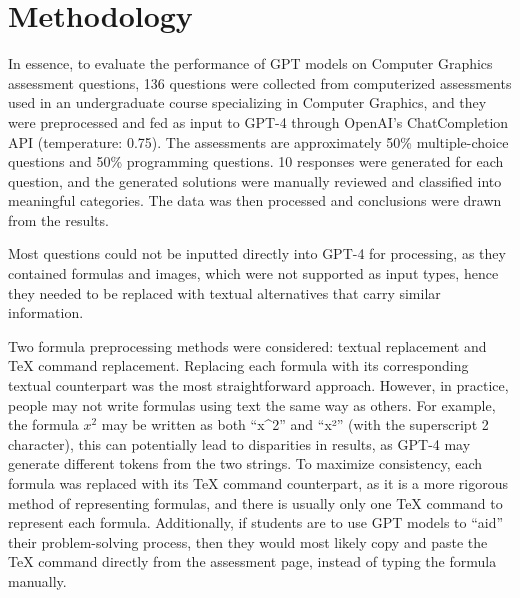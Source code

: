 \documentclass[sigconf,authordraft]{acmart}
\begin{document}
\section{Methodology}
In essence, to evaluate the performance of GPT models on Computer Graphics assessment questions, 136 questions were collected from computerized assessments used in an undergraduate course specializing in Computer Graphics, and they were preprocessed and fed as input to GPT-4 through OpenAI's ChatCompletion API (temperature: 0.75). The assessments are approximately 50\% multiple-choice questions and 50\% programming questions. 10 responses were generated for each question, and the generated solutions were manually reviewed and classified into meaningful categories. The data was then processed and conclusions were drawn from the results.

Most questions could not be inputted directly into GPT-4 for processing, as they contained formulas and images, which were not supported as input types, hence they needed to be replaced with textual alternatives that carry similar information.

Two formula preprocessing methods were considered: textual replacement and TeX command replacement. Replacing each formula with its corresponding textual counterpart was the most straightforward approach. However, in practice, people may not write formulas using text the same way as others. For example, the formula $x^2$ may be written as both ``x\^{}2'' and ``x²'' (with the superscript 2 character), this can potentially lead to disparities in results, as GPT-4 may generate different tokens from the two strings. To maximize consistency, each formula was replaced with its TeX command counterpart, as it is a more rigorous method of representing formulas, and there is usually only one TeX command to represent each formula. Additionally, if students are to use GPT models to ``aid'' their problem-solving process, then they would most likely copy and paste the TeX command directly from the assessment page, instead of typing the formula manually.
\end{document}
